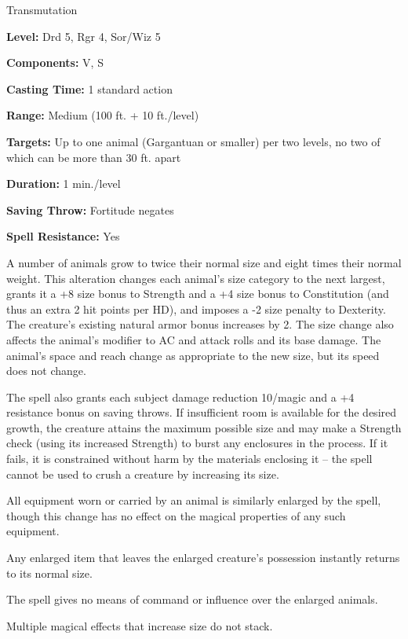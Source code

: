 
Transmutation

\textbf{Level:} Drd 5, Rgr 4, Sor/Wiz 5

\textbf{Components:} V, S

\textbf{Casting Time:} 1 standard action

\textbf{Range:} Medium (100 ft. + 10 ft./level)

\textbf{Targets:} Up to one animal (Gargantuan or smaller) per two levels, no two 
of which can be more than 30 ft. apart

\textbf{Duration:} 1 min./level

\textbf{Saving Throw:} Fortitude negates

\textbf{Spell Resistance:} Yes

A number of animals grow to twice their normal size and eight times their normal 
weight. This alteration changes each animal's size category to the next largest, 
grants it a +8 size bonus to Strength and a +4 size bonus to Constitution (and 
thus an extra 2 hit points per HD), and imposes a -2 size penalty to Dexterity. 
The creature's existing natural armor bonus increases by 2. The size change also 
affects the animal's modifier to AC and attack rolls and its base damage. The animal's 
space and reach change as appropriate to the new size, but its speed does not change.

The spell also grants each subject damage reduction 10/magic and a +4 resistance 
bonus on saving throws. If insufficient room is available for the desired growth, 
the creature attains the maximum possible size and may make a Strength check (using 
its increased Strength) to burst any enclosures in the process. If it fails, it 
is constrained without harm by the materials enclosing it --  the spell cannot be 
used to crush a creature by increasing its size.

All equipment worn or carried by an animal is similarly enlarged by the spell, 
though this change has no effect on the magical properties of any such equipment.

Any enlarged item that leaves the enlarged creature's possession instantly returns 
to its normal size.

The spell gives no means of command or influence over the enlarged animals.

Multiple magical effects that increase size do not stack.


